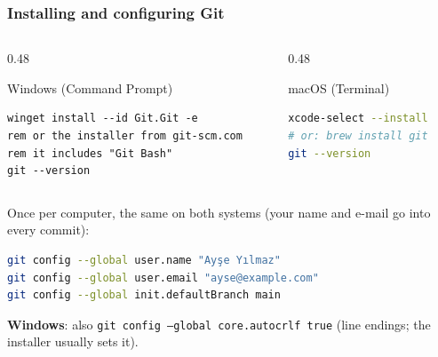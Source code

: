 \documentclass[aspectratio=169,10pt,compress]{beamer}
\newcommand{\win}{\textbf{Windows}}
\begin{document}
\begin{frame}[t,fragile] \frametitle{Installing and configuring Git}
  \begin{columns}[T]
    \begin{column}{0.48\textwidth}
      \begin{block}{Windows (Command Prompt)}


\begin{lstlisting}[style=codesnippet, language={}, basicstyle=\ttfamily\scriptsize]
winget install --id Git.Git -e
rem or the installer from git-scm.com
rem it includes "Git Bash"
git --version
\end{lstlisting}


      \end{block}
    \end{column}
    \begin{column}{0.48\textwidth}
      \begin{block}{macOS (Terminal)}


\begin{lstlisting}[style=codesnippet, language=bash, basicstyle=\ttfamily\scriptsize]
xcode-select --install
# or: brew install git
git --version
\end{lstlisting}


      \end{block}
    \end{column}
  \end{columns}

  \vspace{0.2em}
  \small Once per computer, the same on both systems (your name and e-mail go into every commit):


\begin{lstlisting}[style=codesnippet, language=bash, basicstyle=\ttfamily\scriptsize]
git config --global user.name "Ayşe Yılmaz"
git config --global user.email "ayse@example.com"
git config --global init.defaultBranch main
\end{lstlisting}


  \small \win: also \texttt{git config --global core.autocrlf true} (line endings; the installer usually sets it).
\end{frame}
\end{document}
